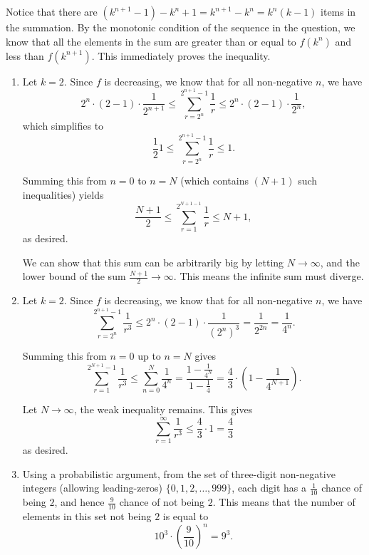 \Question{\currfilebase}

Notice that there are \((k^{n + 1} - 1) - k^n + 1 = k^{n + 1} - k^n = k^n (k - 1)\) items in the summation. By the monotonic condition of the sequence in the question, we know that all the elements in the sum are greater than or equal to \(f(k^n)\) and less than \(f(k^{n + 1})\). This immediately proves the inequality.

\begin{enumerate}
    \item Let \(k = 2\). Since \(f\) is decreasing, we know that for all non-negative \(n\), we have
          \[
              2^n \cdot (2 - 1) \cdot \frac{1}{2^{n + 1}} \leq \sum_{r = 2^n}^{2^{n + 1} - 1} \frac{1}{r} \leq 2^n \cdot (2 - 1) \cdot \frac{1}{2^{n}},
          \]
          which simplifies to
          \[
              \frac{1}{2} 1 \leq \sum_{r = 2^n}^{2^{n + 1} - 1} \frac{1}{r} \leq 1.
          \]

          Summing this from \(n = 0\) to \(n = N\) (which contains \((N + 1)\) such inequalities) yields
          \[
              \frac{N + 1}{2} \leq \sum_{r = 1}^{2^{N + 1 - 1}} \frac{1}{r} \leq N + 1,
          \]
          as desired.

          We can show that this sum can be arbitrarily big by letting \(N \to \infty\), and the lower bound of the sum \(\frac{N + 1}{2} \to \infty\). This means the infinite sum must diverge.

    \item Let \(k = 2\). Since \(f\) is decreasing, we know that for all non-negative \(n\), we have
          \[
              \sum_{r = 2^n}^{2^{n + 1} - 1} \frac{1}{r^3} \leq 2^n \cdot (2 - 1) \cdot \frac{1}{(2^{n})^3} = \frac{1}{2^{2n}} = \frac{1}{4^n}.
          \]

          Summing this from \(n = 0\) up to \(n = N\) gives
          \[
              \sum_{r = 1}^{2^{N + 1} - 1} \frac{1}{r^3} \leq \sum_{n = 0}^{N} \frac{1}{4^n} = \frac{1 - \frac{1}{4^N}}{1 - \frac{1}{4}} = \frac{4}{3} \cdot \left(1 - \frac{1}{4^{N + 1}}\right).
          \]

          Let \(N \to \infty\), the weak inequality remains. This gives
          \[
              \sum_{r = 1}^{\infty} \frac{1}{r^3} \leq \frac{4}{3} \cdot 1 = \frac{4}{3}
          \]
          as desired.

    \item Using a probabilistic argument, from the set of three-digit non-negative integers (allowing leading-zeros) \(\{0, 1, 2, \ldots, 999\}\), each digit has a \(\frac{1}{10}\) chance of being \(2\), and hence \(\frac{9}{10}\) chance of not being \(2\). This means that the number of elements in this set not being \(2\) is equal to
          \[
              10^3 \cdot \left(\frac{9}{10}\right)^n = 9^3.
          \]


\end{enumerate}
